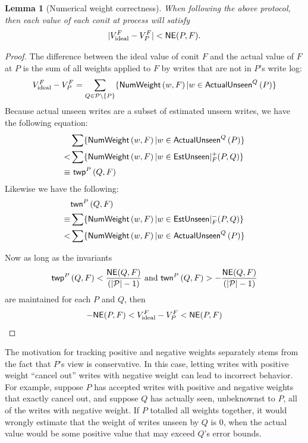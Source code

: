\documentclass[]             %
{NASA}                       %
\newtheorem{lemma}[theorem]{Lemma}
\theoremstyle{definition}
\begin{document}
\begin{lemma}[Numerical weight correctness]
  When following the above protocol, then each value of each conit at process will satisfy
  \[ | V^{F}_{\textrm{ideal}} - V^{F}_{P} | < \mathsf{NE}{(P, F)}. \]
\end{lemma}
\begin{proof}
  The difference between the ideal value of conit $F$ and the actual
  value of $F$ at $P$ is the sum of all weights applied to $F$ by
  writes that are not in $P$'s write log:
  \begin{equation*}
    V^{F}_{\textrm{ideal}} - V^{F}_{P} =  \sum_{Q \in \mathcal{P} \setminus \{P\}} \{ \mathsf{NumWeight}\left(w, F\right) | w \in \mathsf{ActualUnseen}^Q\left(P\right) \}
  \end{equation*}
  Because actual unseen writes are a subset of estimated unseen writes, we have the following equation:
  \begin{align*}
    & \sum \{ \mathsf{NumWeight}\left(w, F\right) | w \in \mathsf{ActualUnseen}^Q\left(P\right) \} \\
    < & \sum \{ \mathsf{NumWeight}\left(w, F\right) | w \in \mathsf{EstUnseen}|^+_F{\left(P,Q\right)} \}\\
    \equiv & \ \mathsf{twp}^{P}\left(Q, F\right)
  \end{align*}
  Likewise we have the following:
  \begin{align*}
    &  \mathsf{twn}^{P}\left(Q, F\right) \\
    \equiv & \sum \{ \mathsf{NumWeight}\left(w, F\right) | w \in \mathsf{EstUnseen}|^-_F{\left(P,Q\right)} \}\\
    < & \sum \{ \mathsf{NumWeight}\left(w, F\right) | w \in \mathsf{ActualUnseen}^Q\left(P\right) \}
  \end{align*}

  Now as long as the invariants
  \begin{equation*}
    \mathsf{twp}^{P}\left(Q, F\right) < \frac{\mathsf{NE}(Q, F)}{\left(|\mathcal{P}|-1\right)}  \textrm{\ and\ } \mathsf{twn}^{P}\left(Q, F\right) > -\frac{\mathsf{NE}(Q, F)}{\left(|\mathcal{P}|-1\right)}
  \end{equation*} are maintained for each $P$ and $Q$, then
  \begin{equation*}
    - \mathsf{NE}{(P, F)} < V^{F}_{\textrm{ideal}} - V^{F}_{P} < \mathsf{NE}{(P, F)}
  \end{equation*}
\end{proof}

The motivation for tracking positive and negative weights separately
stems from the fact that $P$'s view is conservative. In this case,
letting writes with positive weight ``cancel out'' writes with
negative weight can lead to incorrect behavior. For example, suppose
$P$ has accepted writes with positive and negative weights that
exactly cancel out, and suppose $Q$ has actually seen, unbeknownst to
$P$, all of the writes with negative weight. If $P$ totalled all
weights together, it would wrongly estimate that the weight of writes
unseen by $Q$ is $0$, when the actual value would be some positive
value that may exceed $Q$'s error bounds.
\end{document}
